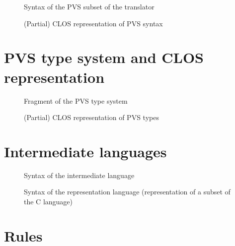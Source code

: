 \documentclass[12pt,a4paper]{article}
\begin{document}
\begin{figure}[h]

\caption{Syntax of the PVS subset of the translator}
\label{fig:PVSsyntax}
\end{figure}

\begin{figure}[!ht]

\caption{(Partial) CLOS representation of PVS syntax}
\label{fig:PVS-CLOS}
\end{figure}

\newpage
\section{PVS type system and CLOS representation}

\begin{figure}[!ht]

\caption{Fragment of the PVS type system}
\label{fig:PVS-types}
\end{figure}


\begin{figure}[!ht]

\caption{(Partial) CLOS representation of PVS types}
\label{fig:PVS-CLOS-types}
\end{figure}


\newpage
\section{Intermediate languages}

\begin{figure}[!ht]

\caption{Syntax of the intermediate language}
\label{fig:aux-syntax}
\end{figure}

\newpage
\begin{figure}[!ht]

\caption{Syntax of the representation language (representation of a subset of the C language)}
\label{fig:Csyntax}
\end{figure}



\newpage
\section{Rules}
\label{Rules}
\end{document}
